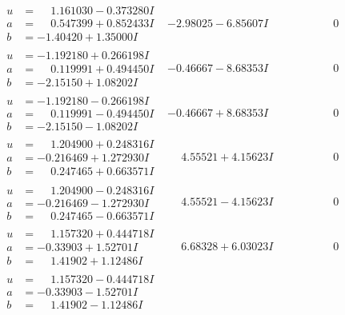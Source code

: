 \documentclass[1p]{elsarticle_modified}
\theoremstyle{definition}
\begin{document}
$$\begin{array}{c|c|c}
\begin{aligned}
u &= \phantom{-}1.161030 - 0.373280 I \\
a &= \phantom{-}0.547399 + 0.852433 I \\
b &= -1.40420 + 1.35000 I\end{aligned}
 & -2.98025 - 6.85607 I & \phantom{-0.000000 } 0 \\ \hline\begin{aligned}
u &= -1.192180 + 0.266198 I \\
a &= \phantom{-}0.119991 + 0.494450 I \\
b &= -2.15150 + 1.08202 I\end{aligned}
 & -0.46667 - 8.68353 I & \phantom{-0.000000 } 0 \\ \hline\begin{aligned}
u &= -1.192180 - 0.266198 I \\
a &= \phantom{-}0.119991 - 0.494450 I \\
b &= -2.15150 - 1.08202 I\end{aligned}
 & -0.46667 + 8.68353 I & \phantom{-0.000000 } 0 \\ \hline\begin{aligned}
u &= \phantom{-}1.204900 + 0.248316 I \\
a &= -0.216469 + 1.272930 I \\
b &= \phantom{-}0.247465 + 0.663571 I\end{aligned}
 & \phantom{-}4.55521 + 4.15623 I & \phantom{-0.000000 } 0 \\ \hline\begin{aligned}
u &= \phantom{-}1.204900 - 0.248316 I \\
a &= -0.216469 - 1.272930 I \\
b &= \phantom{-}0.247465 - 0.663571 I\end{aligned}
 & \phantom{-}4.55521 - 4.15623 I & \phantom{-0.000000 } 0 \\ \hline\begin{aligned}
u &= \phantom{-}1.157320 + 0.444718 I \\
a &= -0.33903 + 1.52701 I \\
b &= \phantom{-}1.41902 + 1.12486 I\end{aligned}
 & \phantom{-}6.68328 + 6.03023 I & \phantom{-0.000000 } 0 \\ \hline\begin{aligned}
u &= \phantom{-}1.157320 - 0.444718 I \\
a &= -0.33903 - 1.52701 I \\
b &= \phantom{-}1.41902 - 1.12486 I\end{aligned}

\end{array}$$
\end{document}
